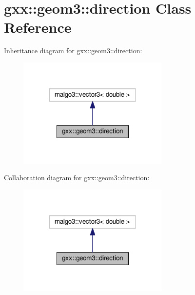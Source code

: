 \hypertarget{classgxx_1_1geom3_1_1direction}{}\section{gxx\+:\+:geom3\+:\+:direction Class Reference}
\label{classgxx_1_1geom3_1_1direction}


Inheritance diagram for gxx\+:\+:geom3\+:\+:direction\+:
\nopagebreak
\begin{figure}[H]
\begin{center}
\leavevmode
\includegraphics[width=213pt]{classgxx_1_1geom3_1_1direction__inherit__graph}
\end{center}
\end{figure}


Collaboration diagram for gxx\+:\+:geom3\+:\+:direction\+:
\nopagebreak
\begin{figure}[H]
\begin{center}
\leavevmode
\includegraphics[width=213pt]{classgxx_1_1geom3_1_1direction__coll__graph}
\end{center}
\end{figure}
